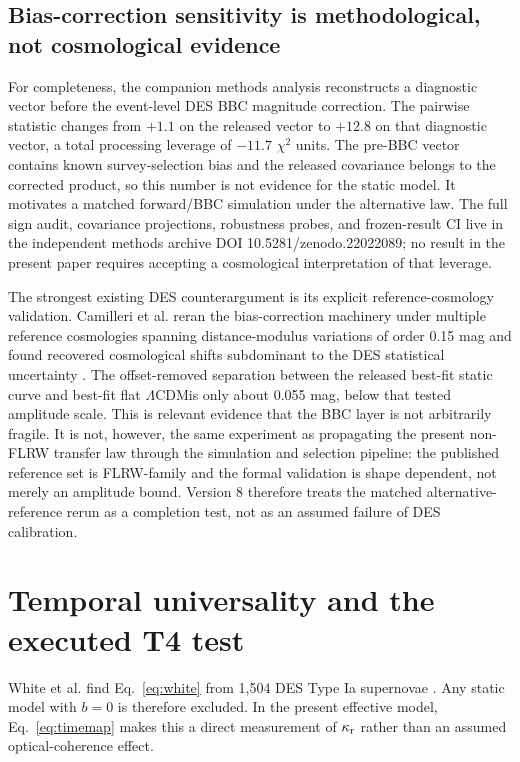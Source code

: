\documentclass[11pt]{article}
\newcommand{\LCDM}{$\Lambda$CDM}
\newcommand{\methodsdoi}{10.5281/zenodo.22022089}
\newcommand{\kreact}{\kappa_{\rm r}}
\begin{document}
\subsection{Bias-correction sensitivity is methodological, not cosmological evidence}
For completeness, the companion methods analysis reconstructs a diagnostic vector before the event-level DES BBC magnitude correction. The pairwise statistic changes from $+1.1$ on the released vector to $+12.8$ on that diagnostic vector, a total processing leverage of $-11.7$ $\chi^2$ units. The pre-BBC vector contains known survey-selection bias and the released covariance belongs to the corrected product, so this number is not evidence for the static model. It motivates a matched forward/BBC simulation under the alternative law. The full sign audit, covariance projections, robustness probes, and frozen-result CI live in the independent methods archive DOI \methodsdoi; no result in the present paper requires accepting a cosmological interpretation of that leverage.

The strongest existing DES counterargument is its explicit reference-cosmology validation. Camilleri et al. reran the bias-correction machinery under multiple reference cosmologies spanning distance-modulus variations of order 0.15 mag and found recovered cosmological shifts subdominant to the DES statistical uncertainty \citep{Camilleri2024}. The offset-removed separation between the released best-fit static curve and best-fit flat \LCDM is only about 0.055 mag, below that tested amplitude scale. This is relevant evidence that the BBC layer is not arbitrarily fragile. It is not, however, the same experiment as propagating the present non-FLRW transfer law through the simulation and selection pipeline: the published reference set is FLRW-family and the formal validation is shape dependent, not merely an amplitude bound. Version 8 therefore treats the matched alternative-reference rerun as a completion test, not as an assumed failure of DES calibration.

\section{Temporal universality and the executed T4 test}
White et al. find Eq.~\eqref{eq:white} from 1,504 DES Type Ia supernovae \citep{White2024}. Any static model with $b=0$ is therefore excluded. In the present effective model, Eq.~\eqref{eq:timemap} makes this a direct measurement of $\kreact$ rather than an assumed optical-coherence effect.
\end{document}
